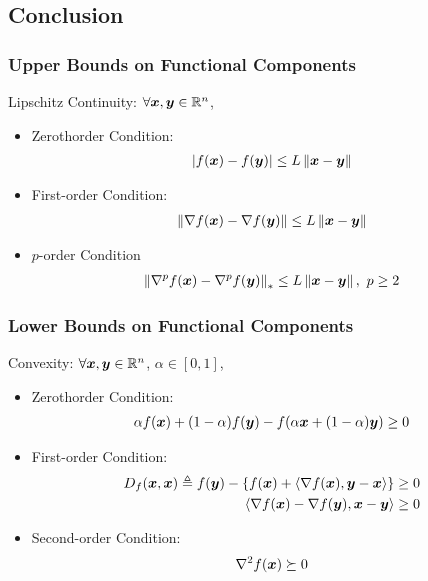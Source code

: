 \subsection{Conclusion}
\subsubsection{Upper Bounds on Functional Components}
Lipschitz Continuity: $\forall \bm{x},\bm{y}\in\mathbb{R}^n$,
\begin{itemize}
    \item Zerothorder Condition:
    \begin{align*}
        |f(\bm{x})-f(\bm{y})|\le L\left\lVert\bm{x}-\bm{y}\right\rVert
    \end{align*}
    \item First-order Condition:
    \begin{align*}
        \left\lVert\nabla f(\bm{x})-\nabla f(\bm{y})\right\rVert\le L\left\lVert\bm{x}-\bm{y}\right\rVert
    \end{align*}
    \item $p$-order Condition
    \begin{align*}
        \norm{\nabla^p f(\bx)-\nabla^p f(\by)}_*\le L\norm{\bx-\by},\ p\ge 2
    \end{align*}
\end{itemize}

\subsubsection{Lower Bounds on Functional Components}
Convexity: $\forall \bm{x},\bm{y}\in\mathbb{R}^n$, $\alpha\in[0,1]$,
\begin{itemize}
    \item Zerothorder Condition:
    \begin{align*}
        \alpha f(\bm{x})+(1-\alpha)f(\bm{y})-f(\alpha \bm{x}+(1-\alpha)\bm{y})\ge 0
    \end{align*}
    \item First-order Condition:
    \begin{align*}
        D_f(\bm{x},\bm{x})\triangleq f(\bm{y})-\{ f(\bm{x})+ \braket{\nabla f(\bm{x}),\bm{y}-\bm{x}} \}&\ge 0\\
        \braket{\nabla f(\bm{x})-\nabla f(\bm{y}),\bm{x}-\bm{y}}  &\ge 0
    \end{align*}
    \item Second-order Condition:
    \begin{align*}
        \nabla^2 f(\bm{x})\succeq 0
    \end{align*}
\end{itemize}


